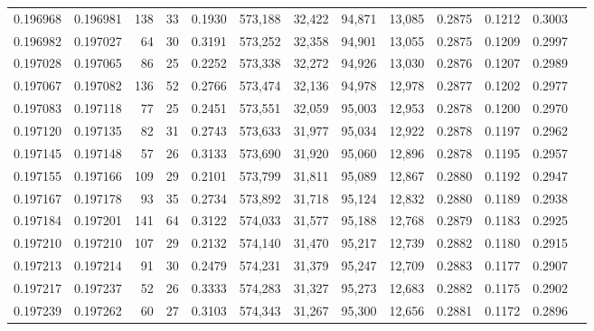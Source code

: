 \begin{tabular}{rrrrrrrrrrrrr}
0.196968 & 0.196981 &   138 &  33 &                                     0.1930 & 573,188 &  32,422 &  94,871 &  13,085 & 0.2875 & 0.1212 & 0.3003 \\
0.196982 & 0.197027 &    64 &  30 &                                     0.3191 & 573,252 &  32,358 &  94,901 &  13,055 & 0.2875 & 0.1209 & 0.2997 \\
0.197028 & 0.197065 &    86 &  25 &                                     0.2252 & 573,338 &  32,272 &  94,926 &  13,030 & 0.2876 & 0.1207 & 0.2989 \\
0.197067 & 0.197082 &   136 &  52 &                                     0.2766 & 573,474 &  32,136 &  94,978 &  12,978 & 0.2877 & 0.1202 & 0.2977 \\
0.197083 & 0.197118 &    77 &  25 &                                     0.2451 & 573,551 &  32,059 &  95,003 &  12,953 & 0.2878 & 0.1200 & 0.2970 \\
0.197120 & 0.197135 &    82 &  31 &                                     0.2743 & 573,633 &  31,977 &  95,034 &  12,922 & 0.2878 & 0.1197 & 0.2962 \\
0.197145 & 0.197148 &    57 &  26 &                                     0.3133 & 573,690 &  31,920 &  95,060 &  12,896 & 0.2878 & 0.1195 & 0.2957 \\
0.197155 & 0.197166 &   109 &  29 &                                     0.2101 & 573,799 &  31,811 &  95,089 &  12,867 & 0.2880 & 0.1192 & 0.2947 \\
0.197167 & 0.197178 &    93 &  35 &                                     0.2734 & 573,892 &  31,718 &  95,124 &  12,832 & 0.2880 & 0.1189 & 0.2938 \\
0.197184 & 0.197201 &   141 &  64 &                                     0.3122 & 574,033 &  31,577 &  95,188 &  12,768 & 0.2879 & 0.1183 & 0.2925 \\
0.197210 & 0.197210 &   107 &  29 &                                     0.2132 & 574,140 &  31,470 &  95,217 &  12,739 & 0.2882 & 0.1180 & 0.2915 \\
0.197213 & 0.197214 &    91 &  30 &                                     0.2479 & 574,231 &  31,379 &  95,247 &  12,709 & 0.2883 & 0.1177 & 0.2907 \\
0.197217 & 0.197237 &    52 &  26 &                                     0.3333 & 574,283 &  31,327 &  95,273 &  12,683 & 0.2882 & 0.1175 & 0.2902 \\
0.197239 & 0.197262 &    60 &  27 &                                     0.3103 & 574,343 &  31,267 &  95,300 &  12,656 & 0.2881 & 0.1172 & 0.2896 \\

\end{tabular}
